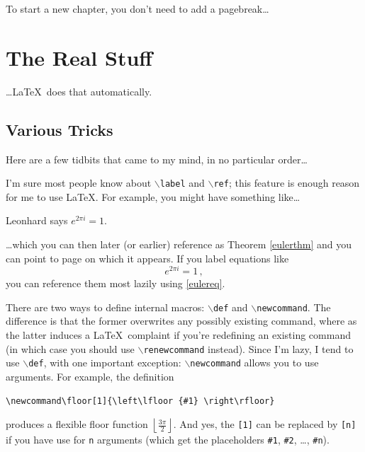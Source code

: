 \documentclass{article}
\begin{document}
To start a new chapter, you don't need to add a pagebreak\dots

\chapter{The Real Stuff}

\dots \LaTeX \ does that automatically.

\section{Various Tricks}

Here are a few tidbits that came to my mind, in no particular order\dots

I'm sure most people know about {\tt $\backslash$label} and {\tt $\backslash$ref}; this feature is enough reason for me to use \LaTeX. 
For example, you might have something like\dots

\begin{theorem}[Euler]\label{eulerthm}
Leonhard says $e^{ 2 \pi i } = 1$.
\end{theorem}

\dots which you can then later (or earlier) reference as Theorem \ref{eulerthm} and you can point to page \pageref{eulerthm} on which it appears.
If you label equations like
\begin{equation}\label{eulereq}
  e^{ 2 \pi i } = 1 \, ,
\end{equation}
you can reference them most lazily using \eqref{eulereq}.

\def\v{{\mathbf v}}
\def\P{{\mathcal P}}
\def\Z{\mathbb{Z}}
\newcommand\floor[1]{\left\lfloor {#1} \right\rfloor} 

There are two ways to define internal macros: {\tt $\backslash$def} and {\tt $\backslash$newcommand}. The difference is that the former overwrites any possibly existing command,
where as the latter induces a \LaTeX \ complaint if you're redefining an existing command (in which case you should use {\tt $\backslash$renewcommand} instead). Since I'm lazy,
I tend to use {\tt $\backslash$def}, with one important exception: {\tt $\backslash$newcommand} allows you to use arguments. For example, the definition
\begin{verbatim}
\newcommand\floor[1]{\left\lfloor {#1} \right\rfloor} 
\end{verbatim}
produces a flexible floor function $\floor{\frac{ 3\pi }{ 2 }}$. And yes, the {\tt [1]} can be replaced by {\tt [n]} if you have use for {\tt n} arguments (which get the
placeholders {\tt \#1}, {\tt \#2}, \dots, {\tt \#n}).
\end{document}
